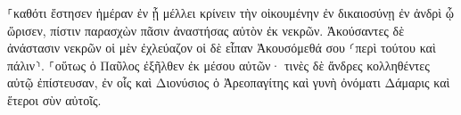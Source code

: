 \documentclass{openreader}
\begin{document}
⸀καθότι ἔστησεν ἡμέραν ἐν ᾗ μέλλει κρίνειν τὴν οἰκουμένην ἐν δικαιοσύνῃ ἐν ἀνδρὶ ᾧ ὥρισεν, πίστιν παρασχὼν πᾶσιν ἀναστήσας αὐτὸν ἐκ νεκρῶν. 
Ἀκούσαντες δὲ ἀνάστασιν νεκρῶν οἱ μὲν ἐχλεύαζον οἱ δὲ εἶπαν Ἀκουσόμεθά σου ⸂περὶ τούτου καὶ πάλιν⸃. 
⸀οὕτως ὁ Παῦλος ἐξῆλθεν ἐκ μέσου αὐτῶν· 
τινὲς δὲ ἄνδρες κολληθέντες αὐτῷ ἐπίστευσαν, ἐν οἷς καὶ Διονύσιος ὁ Ἀρεοπαγίτης καὶ γυνὴ ὀνόματι Δάμαρις καὶ ἕτεροι σὺν αὐτοῖς. 
\end{document}
